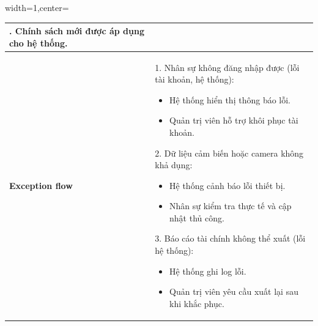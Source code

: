 \begin{adjustbox}{width=1\textwidth,center=\textwidth}
\begin{tabular}{|>{\centering\arraybackslash}m{3.5cm}|m{13.2cm}|}
3. Chính sách mới được áp dụng cho hệ thống. \\ \hline
\textbf{Exception flow} & 
1. Nhân sự không đăng nhập được (lỗi tài khoản, hệ thống): 
\begin{itemize}
    \item Hệ thống hiển thị thông báo lỗi.
    \item Quản trị viên hỗ trợ khôi phục tài khoản.
\end{itemize}
2. Dữ liệu cảm biến hoặc camera không khả dụng:
\begin{itemize}
    \item Hệ thống cảnh báo lỗi thiết bị.
    \item Nhân sự kiểm tra thực tế và cập nhật thủ công.
\end{itemize}
3. Báo cáo tài chính không thể xuất (lỗi hệ thống):
\begin{itemize}
    \item Hệ thống ghi log lỗi.
    \item Quản trị viên yêu cầu xuất lại sau khi khắc phục.
\end{itemize}
\\ \hline
\end{tabular}
\end{adjustbox}